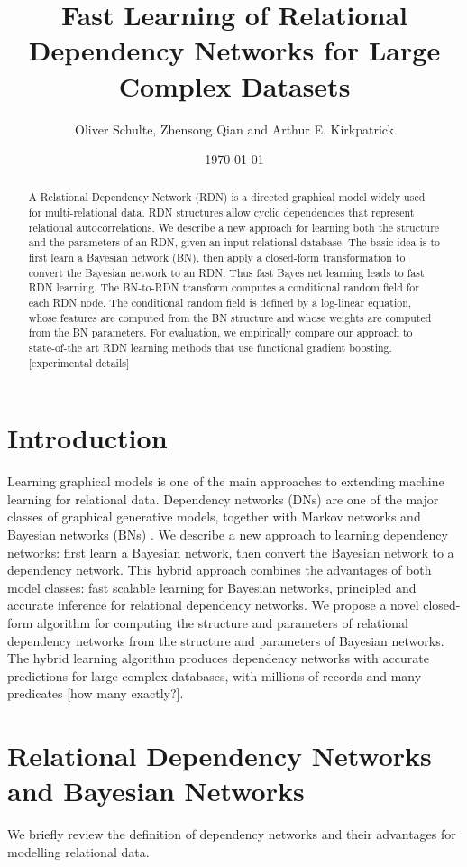 \documentclass[runningheads,a4paper]{llncs}
\title{Fast Learning of Relational Dependency Networks for Large Complex Datasets}
\author{ Oliver Schulte, Zhensong Qian and  Arthur E. Kirkpatrick
 }
\institute{ School of Computing Science\\ Simon Fraser University\\Vancouver-Burnaby, Canada\\
\{zqian,oschulte\}@sfu.ca\\
\url{http://www.cs.sfu.ca/~oschulte/}}
\date{\today}
\begin{document}
\maketitle



\begin{abstract} 
A Relational Dependency Network (RDN) is a directed graphical model widely used for multi-relational data. RDN structures allow cyclic dependencies that represent relational autocorrelations. We describe a new approach for learning both the structure and the parameters of an RDN, given an input relational database. The basic idea is to first learn a Bayesian network (BN), then apply a closed-form transformation to convert the Bayesian network to an RDN. Thus fast Bayes net learning leads to fast RDN learning. The BN-to-RDN transform computes a conditional random field for each RDN node. The conditional random field is defined by a log-linear equation, whose features are computed from the BN structure and whose weights are computed from the BN parameters. For evaluation, we empirically compare our approach to state-of-the art RDN learning methods that use functional gradient boosting. [experimental details]\end{abstract}


 \section{Introduction} \label{sec:intro} Learning graphical models is one of the main approaches to extending machine learning for relational data. 
Dependency networks (DNs) \cite{Heckerman2000} are one of the major classes of graphical generative models, together with Markov networks and Bayesian networks (BNs) \cite{Pearl1988}. We describe a new approach to learning dependency networks: first learn a Bayesian network, then convert the Bayesian network to a dependency network. This hybrid approach combines the advantages of both model classes: fast scalable learning for Bayesian networks, principled and accurate inference for relational dependency networks. We propose a novel closed-form algorithm for computing the structure and parameters of relational dependency networks from the structure and parameters of Bayesian networks. The hybrid learning algorithm produces  dependency networks with accurate predictions for large complex databases, with millions of records and many predicates [how many exactly?]. 
  
 \section{Relational Dependency Networks and Bayesian Networks} We briefly review the definition of dependency networks and their advantages for modelling relational data. 
 
\end{document}
